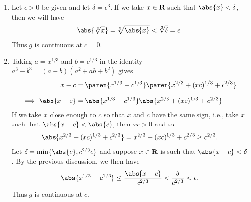 \documentclass{lew98_solutions}
\begin{document}
\begin{solution}
    \begin{enumerate}
        \item Let \( \epsilon > 0 \) be given and let \( \delta = \epsilon^3 \). If we take \( x \in \mathbf{R} \) such that \( \abs{x} < \delta \), then we will have
        \[
            \abs{\sqrt[3]{x}} = \sqrt[3]{\abs{x}} < \sqrt[3]{\delta} = \epsilon.
        \]
        Thus \( g \) is continuous at \( c = 0 \).

        \item Taking \( a = x^{1/3} \) and \( b = c^{1/3} \) in the identity \( a^3 - b^3 = (a - b)(a^2 + ab + b^2) \) gives
        \begin{align*}
            x - c &= \paren{ x^{1/3} - c^{1/3} } \paren{ x^{2/3} + (xc)^{1/3} + c^{2/3} } \\[2mm]
            \implies \abs{x - c} &= \abs{x^{1/3} - c^{1/3}} \abs{x^{2/3} + (xc)^{1/3} + c^{2/3}}.
        \end{align*}
        If we take \( x \) close enough to \( c \) so that \( x \) and \( c \) have the same sign, i.e., take \( x \) such that \( \abs{x - c} < \abs{c} \), then \( xc > 0 \) and so
        \[
            \abs{x^{2/3} + (xc)^{1/3} + c^{2/3}} = x^{2/3} + (xc)^{1/3} + c^{2/3} \geq c^{2/3}.
        \]
        Let \( \delta = \min \{ \abs{c}, c^{2/3} \epsilon \} \) and suppose \( x \in \mathbf{R} \) is such that \( \abs{x - c} < \delta \). By the previous discussion, we then have
        \[
            \abs{x^{1/3} - c^{1/3}} \leq \frac{\abs{x - c}}{c^{2/3}} < \frac{\delta}{c^{2/3}} < \epsilon.
        \]
        Thus \( g \) is continuous at \( c \).
    \end{enumerate}
\end{solution}
\end{document}
